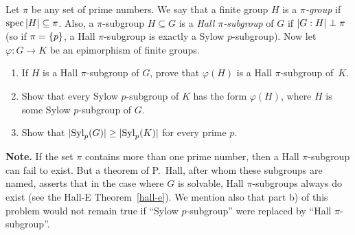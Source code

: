 \begin{probl}\label{problem-1.B.5}
    Let $\pi$ be any set of prime numbers. We say that a finite group\/ $H$ is a \textsl{$\pi$-group} if\/ $\operatorname{spec}\left\vert{H}\right\vert\subseteq\pi$. Also, a\/ $\pi$-subgroup $H \subseteq G$ is a \textsl{Hall $\pi$-subgroup} of\/ $G$ if\/ $\left\vert{G:H}\right\vert\perp\pi$ (so if\/ $\pi = \{p\}$, a Hall\/ $\pi$-subgroup is exactly a Sylow $p$-subgroup). Now let $\varphi\colon G \to K$ be an epimorphism of finite groups. 
    \begin{enumerate}[\upshape a)]
        \item If\/ $H$ is a Hall\/ $\pi$-subgroup of\/ $G$, prove that $\varphi(H)$ is a Hall\/ $\pi$-subgroup of\/~$K$.

        \item Show that every Sylow $p$-subgroup of $K$ has the form $\varphi(H)$, where $H$ is some Sylow $p$-subgroup of\/ $G$. 
        
        \item Show that $|{\rm Syl}_p(G)|\ge|{\rm Syl}_p(K)|$ for every prime $p$.
    \end{enumerate}

    \textrm{\upshape\textbf{Note.} If the set $\pi$ contains more than one prime number, then a Hall $\pi$-subgroup can fail to exist. But a theorem of\/ P.~Hall, after whom these subgroups are named, asserts that in the case where $G$ is solvable, Hall $\pi$-subgroups always do exist (see the Hall-E Theorem~\ref{hall-e}). We mention also that part b) of this problem would not remain true if ``Sylow $p$-subgroup'' were replaced by ``Hall $\pi$-subgroup''.}
\end{probl}

